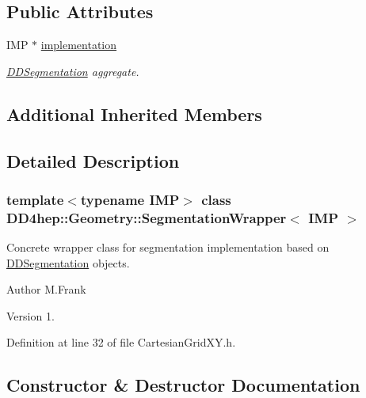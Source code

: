 \subsection*{Public Attributes}
\begin{DoxyCompactItemize}
\item 
I\+MP $\ast$ \hyperlink{class_d_d4hep_1_1_geometry_1_1_segmentation_wrapper_a1f5c880ae30f25a0dd16cfd963aea926}{implementation}
\begin{DoxyCompactList}\small\item\em \hyperlink{namespace_d_d4hep_1_1_d_d_segmentation}{D\+D\+Segmentation} aggregate. \end{DoxyCompactList}\end{DoxyCompactItemize}
\subsection*{Additional Inherited Members}


\subsection{Detailed Description}
\subsubsection*{template$<$typename I\+MP$>$\newline
class D\+D4hep\+::\+Geometry\+::\+Segmentation\+Wrapper$<$ I\+M\+P $>$}

Concrete wrapper class for segmentation implementation based on \hyperlink{namespace_d_d4hep_1_1_d_d_segmentation}{D\+D\+Segmentation} objects. 

\begin{DoxyAuthor}{Author}
M.\+Frank 
\end{DoxyAuthor}
\begin{DoxyVersion}{Version}
1. 
\end{DoxyVersion}


Definition at line 32 of file Cartesian\+Grid\+X\+Y.\+h.



\subsection{Constructor \& Destructor Documentation}
\hypertarget{class_d_d4hep_1_1_geometry_1_1_segmentation_wrapper_a422a008dd4769304777684a719f5801f}{}\label{class_d_d4hep_1_1_geometry_1_1_segmentation_wrapper_a422a008dd4769304777684a719f5801f} 
